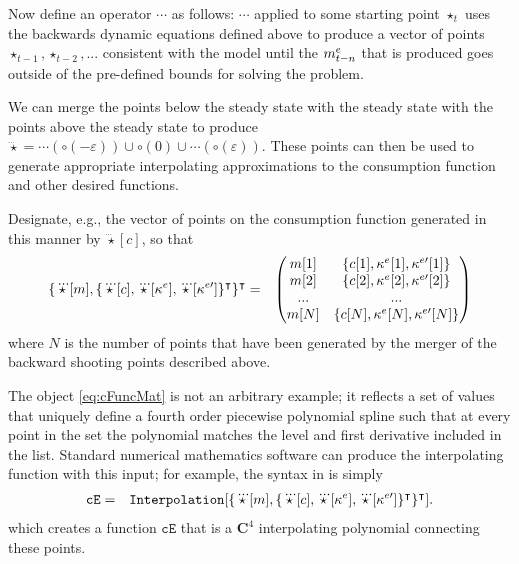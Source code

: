\documentclass{handout}
\begin{document}
Now define an operator $\cdots$ as follows: $\cdots$ applied to some
starting point $\star_{t}$ uses the backwards dynamic equations
defined above to produce a vector of points
$\star_{t-1},\star_{t-2},...$ consistent with the model until the
$m^{e}_{t-n}$ that is produced goes outside of the pre-defined bounds
for solving the problem.

We can merge the points below the steady state with the steady state
with the points above the steady state to produce $\dddot{\star} =
\cdots(\pmb{\circ}(-\varepsilon)) \cup \pmb{\circ}(0) \cup
\cdots(\pmb{\circ}(\varepsilon)) $.  These points can then be used to
generate appropriate interpolating approximations to the consumption
function and other desired functions.

Designate, e.g., the vector of points on the consumption function
generated in this manner by $\dddot{\star}[c]$, so that 
\begin{eqnarray}
   \{\dddot{\star}[m],\{\dddot{\star}[c],\dddot{\star}[\kappa^{e}],\dddot{\star}[\kappa^{e\prime}]\}^{\intercal}\}^{\intercal} & = & 
\begin{pmatrix}
m[1] & \{c[1],\kappa^{e}[1],\kappa^{e\prime}[1]\} \\
m[2] & \{c[2],\kappa^{e}[2],\kappa^{e\prime}[2]\} \\
...  & ...              \\
m[N] & \{c[N],\kappa^{e}[N],\kappa^{e\prime}[N]\} \\
\end{pmatrix} \label{eq:cFuncMat}
\end{eqnarray}
where $N$ is the number of points that have been generated by the merger of the backward
shooting points described above.  

The object \eqref{eq:cFuncMat} is not an arbitrary example; it reflects a set of values that 
uniquely define a fourth order piecewise polynomial spline such that at every point in the 
set the polynomial matches the level and first derivative included in the list.  Standard
numerical mathematics software can produce the interpolating function with this input; 
for example, the syntax in \Mma is simply
\begin{eqnarray}
  \mathtt{cE} & = & \mathtt{Interpolation}[\{\dddot{\star}[m],\{\dddot{\star}[c],\dddot{\star}[\kappa^{e}],\dddot{\star}[\kappa^{e\prime}]\}^{\intercal}\}^{\intercal}].
\end{eqnarray}
which creates a function $\texttt{cE}$ that is a $\mathbf{C}^4$ interpolating polynomial
connecting these points.
\end{document}
